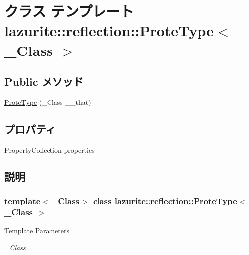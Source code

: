 \hypertarget{classlazurite_1_1reflection_1_1_prote_type_3_01___class_01_4}{
\section{クラス テンプレート lazurite::reflection::ProteType$<$ \_\-Class $>$}
\label{classlazurite_1_1reflection_1_1_prote_type_3_01___class_01_4}
}
\subsection*{Public メソッド}
\begin{DoxyCompactItemize}
\item 
\hyperlink{classlazurite_1_1reflection_1_1_prote_type_3_01___class_01_4_af3a433ed8e5433a6af4bd23719a823ad}{ProteType} (\_\-Class \_\-\_\-that)
\end{DoxyCompactItemize}
\subsection*{プロパティ}
\begin{DoxyCompactItemize}
\item 
\hyperlink{classlazurite_1_1reflection_1_1_property_collection}{PropertyCollection} \hyperlink{classlazurite_1_1reflection_1_1_prote_type_3_01___class_01_4_a0009b65ad9e76a865b8fef27a9b1578f}{properties}
\end{DoxyCompactItemize}


\subsection{説明}
\subsubsection*{template$<$\_\-Class$>$ class lazurite::reflection::ProteType$<$ \_\-Class $>$}


\begin{DoxyTemplParams}{Template Parameters}
\item[{\em \_\-Class}]\end{DoxyTemplParams}


